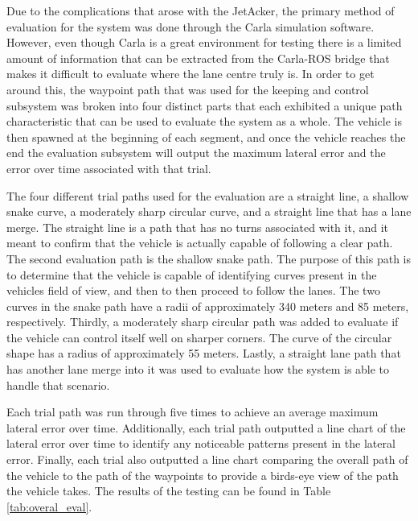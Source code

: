 \documentclass[titlepage,draft]{article}
\begin{document}
{Due to the complications that arose with the JetAcker, the primary method of evaluation for the system was done through the Carla simulation software. However, even though Carla is a great environment for testing there is a limited amount of information that can be extracted from the Carla-ROS bridge that makes it difficult to evaluate where the lane centre truly is. In order to get around this, the waypoint path that was used for the keeping and control subsystem was broken into four distinct parts that each exhibited a unique path characteristic that can be used to evaluate the system as a whole. The vehicle is then spawned at the beginning of each segment, and once the vehicle reaches the end the evaluation subsystem will output the maximum lateral error and the error over time associated with that trial.

The four different trial paths used for the evaluation are a straight line, a shallow snake curve, a moderately sharp circular curve, and a straight line that has a lane merge. The straight line is a path that has no turns associated with it, and it meant to confirm that the vehicle is actually capable of following a clear path. The second evaluation path is the shallow snake path. The purpose of this path is to determine that the vehicle is capable of identifying curves present in the vehicles field of view, and then to then proceed to follow the lanes. The two curves in the snake path have a radii of approximately 340 meters and 85 meters, respectively. Thirdly, a moderately sharp circular path was added to evaluate if the vehicle can control itself well on sharper corners. The curve of the circular shape has a radius of approximately 55 meters. Lastly, a straight lane path that has another lane merge into it was used to evaluate how the system is able to handle that scenario.

Each trial path was run through five times to achieve an average maximum lateral error over time. Additionally, each trial path outputted a line chart of the lateral error over time to identify any noticeable patterns present in the lateral error. Finally, each trial also outputted a line chart comparing the overall path of the vehicle to the path of the waypoints to provide a birds-eye view of the path the vehicle takes. The results of the testing can be found in Table \ref{tab:overal_eval}.

}
\end{document}
